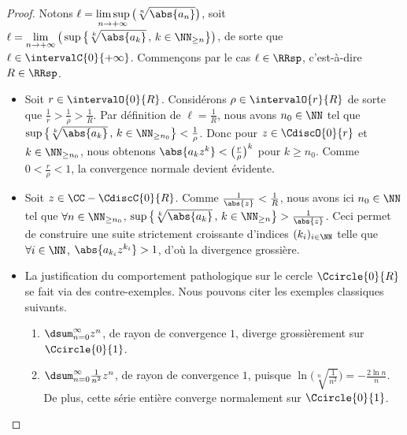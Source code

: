 \begin{proof}
    Notons 
    $\displaystyle \ell
    = \limsup_{n \to +\infty} \big( \sqrt[n]{\abs{a_n}} \big)$,
    soit
    $\displaystyle \ell
    = \lim_{n \to +\infty} \big( \sup \big\{ \sqrt[k]{\abs{a_k}} \,,\, k \in \NN_{\geq n} \big\} \big)$,
    de sorte que $\ell \in \intervalC{0}{+\infty}$.
    Commençons par le cas $\ell \in \RRsp$, c'est-à-dire $R \in \RRsp$.
    \begin{itemize}
        \item Soit $r \in \intervalO{0}{R}$.
        Considérons $\rho  \in \intervalO{r}{R}$ de sorte que $\frac1r > \frac{1}{\rho} > \frac1R$.
        Par définition de $\ell = \frac1R$,
        nous avons $n_0 \in \NN$ tel que
        $\sup \big\{ \sqrt[k]{\abs{a_k}} \,,\, k \in \NN_{\geq n_0} \big\} < \frac{1}{\rho}$.
        Donc pour $z \in \CdiscO{0}{r}$ et $k \in \NN_{\geq n_0}$, nous obtenons
        $\abs{a_k z^k} < \big( \frac{r}{\rho} \big)^k$ pour $k \geq n_0$.
        Comme $0 < \frac{r}{\rho} < 1$, la convergence normale devient évidente.


        \item Soit $z \in \CC - \CdiscC{0}{R}$.
        Comme $\frac{1}{\abs{z}} < \frac{1}{R}$, nous avons ici $n_0 \in \NN$ tel que
        $\forall n \in \NN_{\geq n_0}$,
        $\sup \big\{ \sqrt[k]{\abs{a_k}} \,,\, k \in \NN_{\geq n} \big\} > \frac{1}{\abs{z}}$.
        Ceci permet de construire une suite strictement croissante d'indices $(k_i)_{i \in \NN}$
        telle que
        $\forall i \in \NN$, $\abs{a_{k_i} z^{k_i}} > 1$,
        d'où la divergence grossière.


        \item La justification du comportement pathologique sur le cercle $\Ccircle{0}{R}$ se fait via des contre-exemples. Nous pouvons citer les exemples classiques suivants.
        \begin{enumerate}[label=(\alph*)]
	        \item $\dsum_{n=0}^{\infty} z^n$, 
	        de rayon de convergence $1$, 
	        diverge grossièrement sur $\Ccircle{0}{1}$.

	        \item $\dsum_{n=0}^{\infty} \frac{1}{n^2} z^n$, 
	        de rayon de convergence $1$,
	        puisque 
	        $ \ln \big( \sqrt[n]{\frac{1}{n^2}} \big)
	        = -\frac{2 \ln n}{n}$.
	        De plus,
	        cette série entière converge normalement sur $\Ccircle{0}{1}$.


\end{enumerate}
\end{itemize}
\end{proof}
